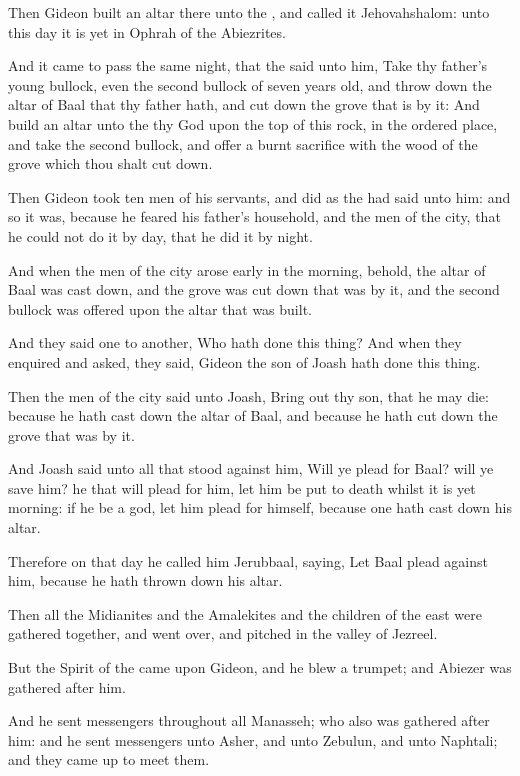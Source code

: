 \verse Then Gideon built an altar there unto the \LORD, and called it Jehovahshalom: unto this day it is yet in Ophrah of the Abiezrites.

\verse And it came to pass the same night, that the \LORD said unto him, Take thy father's young bullock, even the second bullock of seven years old, and throw down the altar of Baal that thy father hath, and cut down the grove that is by it: \verse And build an altar unto the \LORD thy God upon the top of this rock, in the ordered place, and take the second bullock, and offer a burnt sacrifice with the wood of the grove which thou shalt cut down.

\verse Then Gideon took ten men of his servants, and did as the \LORD had said unto him: and so it was, because he feared his father's household, and the men of the city, that he could not do it by day, that he did it by night.

\verse And when the men of the city arose early in the morning, behold, the altar of Baal was cast down, and the grove was cut down that was by it, and the second bullock was offered upon the altar that was built.

\verse And they said one to another, Who hath done this thing? And when they enquired and asked, they said, Gideon the son of Joash hath done this thing.

\verse Then the men of the city said unto Joash, Bring out thy son, that he may die: because he hath cast down the altar of Baal, and because he hath cut down the grove that was by it.

\verse And Joash said unto all that stood against him, Will ye plead for Baal? will ye save him? he that will plead for him, let him be put to death whilst it is yet morning: if he be a god, let him plead for himself, because one hath cast down his altar.

\verse Therefore on that day he called him Jerubbaal, saying, Let Baal plead against him, because he hath thrown down his altar.

\verse Then all the Midianites and the Amalekites and the children of the east were gathered together, and went over, and pitched in the valley of Jezreel.

\verse But the Spirit of the \LORD came upon Gideon, and he blew a trumpet; and Abiezer was gathered after him.

\verse And he sent messengers throughout all Manasseh; who also was gathered after him: and he sent messengers unto Asher, and unto Zebulun, and unto Naphtali; and they came up to meet them.

